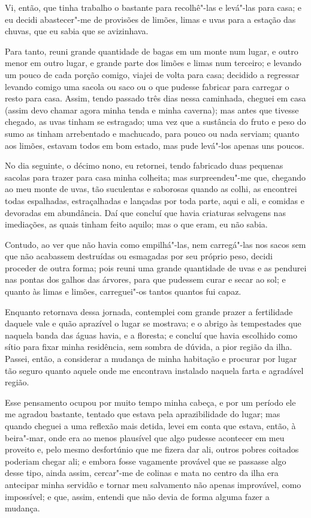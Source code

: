 Vi, então, que tinha trabalho o bastante para recolhê"-las e levá"-las
para casa; e eu decidi abastecer"-me de provisões de limões, limas e uvas
para a estação das chuvas, que eu sabia que se avizinhava.

Para tanto, reuni grande quantidade de bagas em um monte num lugar, e
outro menor em outro lugar, e grande parte dos limões e limas num
terceiro; e levando um pouco de cada porção comigo, viajei de volta para
casa; decidido a regressar levando comigo uma sacola ou saco ou o que
pudesse fabricar para carregar o resto para casa. Assim, tendo passado
três dias nessa caminhada, cheguei em casa (assim devo chamar agora
minha tenda e minha caverna); mas antes que tivesse chegado, as uvas
tinham se estragado; uma vez que a sustância do fruto e peso do sumo as
tinham arrebentado e machucado, para pouco ou nada serviam; quanto aos
limões, estavam todos em bom estado, mas pude levá"-los apenas uns
poucos.

No dia seguinte, o décimo nono, eu retornei, tendo fabricado duas
pequenas sacolas para trazer para casa minha colheita; mas
surpreendeu"-me que, chegando ao meu monte de uvas, tão suculentas e
saborosas quando as colhi, as encontrei todas espalhadas, estraçalhadas
e lançadas por toda parte, aqui e ali, e comidas e devoradas em
abundância. Daí que concluí que havia criaturas selvagens nas
imediações, as quais tinham feito aquilo; mas o que eram, eu não sabia.

Contudo, ao ver que não havia como empilhá"-las, nem carregá"-las nos
sacos sem que não acabassem destruídas ou esmagadas por seu próprio
peso, decidi proceder de outra forma; pois reuni uma grande quantidade
de uvas e as pendurei nas pontas dos galhos das árvores, para que
pudessem curar e secar ao sol; e quanto às limas e limões, carreguei"-os
tantos quantos fui capaz.

Enquanto retornava dessa jornada, contemplei com grande prazer a
fertilidade daquele vale e quão aprazível o lugar se mostrava; e o
abrigo às tempestades que naquela banda das águas havia, e a floresta; e
concluí que havia escolhido como sítio para fixar minha residência, sem
sombra de dúvida, a pior região da ilha. Passei, então, a considerar a
mudança de minha habitação e procurar por lugar tão seguro quanto aquele
onde me encontrava instalado naquela farta e agradável região.

Esse pensamento ocupou por muito tempo minha cabeça, e por um período
ele me agradou bastante, tentado que estava pela aprazibilidade do
lugar; mas quando cheguei a uma reflexão mais detida, levei em conta que
estava, então, à beira"-mar, onde era ao menos plausível que algo pudesse
acontecer em meu proveito e, pelo mesmo desfortúnio que me fizera dar
ali, outros pobres coitados poderiam chegar ali; e embora fosse
vagamente provável que se passasse algo desse tipo, ainda assim,
cercar"-me de colinas e mata no centro da ilha era antecipar minha
servidão e tornar meu salvamento não apenas improvável, como impossível;
e que, assim, entendi que não devia de forma alguma fazer a mudança.

